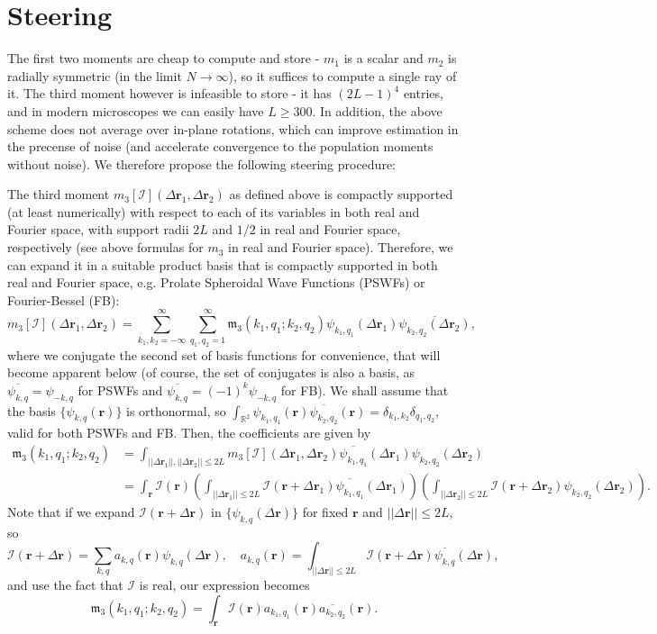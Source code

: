 \documentclass[english,11pt]{article}
\newcommand{\1}{\mathbf{1}}
\newcommand{\rr}{\textbf{r}}
\newcommand{\II}{\mathcal{I}}
\newcommand{\RR}{\mathbb{R}}
\numberwithin{equation}{section}
\theoremstyle{plain}
\theoremstyle{definition}
\theoremstyle{remark}
\theoremstyle{plain}
\theoremstyle{remark}
\theoremstyle{plain}
\theoremstyle{plain}
\begin{document}
\section{Steering}\label{sec:steering}
The first two moments are cheap to compute and store - $m_1$ is a scalar and $m_2$ is radially symmetric (in the limit $N\to\infty$), so it suffices to compute a single ray of it. The third moment however is infeasible to store - it has $(2L-1)^4$ entries, and in modern microscopes we can easily have $L\geq 300$. In addition, the above scheme does not average over in-plane rotations, which can improve estimation in the precense of noise (and accelerate convergence to the population moments without noise). We therefore propose the following steering procedure:

The third moment $m_3[\II](\Delta \rr_1,\Delta \rr_2)$ as defined above is compactly supported (at least numerically) with respect to each of its variables in both real and Fourier space, with support radii $2L$ and $1/2$ in real and Fourier space, respectively (see above formulas for $m_3$ in real and Fourier space). Therefore, we can expand it in a suitable product basis that is compactly supported in both real and Fourier space, e.g. Prolate Spheroidal Wave Functions (PSWFs) or Fourier-Bessel (FB):
\[ m_3[\II](\Delta \rr_1, \Delta \rr_2) = \sum_{k_1,k_2=-\infty}^{\infty}\sum_{q_1,q_2=1}^{\infty}\mathfrak{m}_3(k_1,q_1;k_2,q_2)\psi_{k_1,q_1}(\Delta\rr_1)\overline{\psi_{k_2,q_2}(\Delta\rr_2)},\]
where we conjugate the second set of basis functions for convenience, that will become apparent below (of course, the set of conjugates is also a basis, as $\overline{\psi_{k,q}}=\psi_{-k,q}$ for PSWFs and $\overline{\psi_{k,q}}=(-1)^k\psi_{-k,q}$ for FB). We shall assume that the basis $\{\psi_{k,q}(\rr)\}$ is orthonormal, so $\int_{\RR^2}\psi_{k_1,q_1}(\rr)\overline{\psi_{k_2,q_2}}(\rr) = \delta_{k_1,k_2}\delta_{q_1,q_2}$, valid for both PSWFs and FB. Then, the coefficients are given by
\[\begin{aligned} \mathfrak{m}_3(k_1,q_1;k_2,q_2) &= \int_{||\Delta\rr_1||,||\Delta\rr_2||\leq 2L}m_3[\II](\Delta\rr_1,\Delta\rr_2)\overline{\psi_{k_1,q_1}}(\Delta\rr_1)\psi_{k_2,q_2}(\Delta\rr_2)\\
&= \int_{\rr}\II(\rr)\left(\int_{||\Delta\rr_1||\leq 2L}\II(\rr+\Delta\rr_1)\overline{\psi_{k_1,q_1}}(\Delta\rr_1)\right)\left(\int_{||\Delta\rr_2||\leq 2L}\II(\rr+\Delta\rr_2)\psi_{k_2,q_2}(\Delta\rr_2)\right).\end{aligned}\]
Note that if we expand $\II(\rr+\Delta\rr)$ in $\{\psi_{k,q}(\Delta\rr)\}$ for fixed $\rr$ and $||\Delta\rr||\leq 2L$, so
\[ \II(\rr+\Delta\rr) = \sum_{k,q}a_{k,q}(\rr)\psi_{k,q}(\Delta\rr),\quad a_{k,q}(\rr)=\int_{||\Delta\rr||\leq 2L}\II(\rr+\Delta\rr)\overline{\psi_{k,q}}(\Delta\rr),\]
and use the fact that $\II$ is real, our expression becomes
\[ \mathfrak{m}_3(k_1,q_1;k_2,q_2) = \int_{\rr}\II(\rr)a_{k_1,q_1}(\rr)\overline{a_{k_2,q_2}}(\rr).\]
\end{document}
